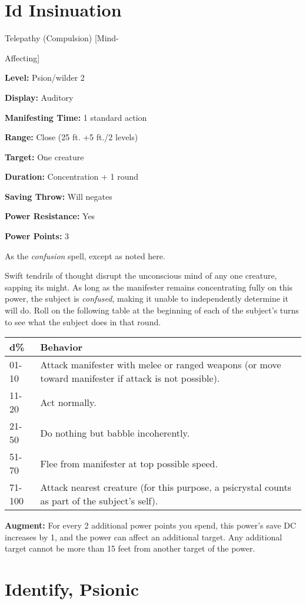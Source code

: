 \documentclass{article}
\begin{document}
\section*{Id Insinuation}

Telepathy (Compulsion) [Mind-

Affecting]

\textbf{Level:} Psion/wilder 2

\textbf{Display:} Auditory

\textbf{Manifesting Time:} 1 standard action

\textbf{Range:} Close (25 ft. +5 ft./2 levels)

\textbf{Target:} One creature

\textbf{Duration:} Concentration + 1 round

\textbf{Saving Throw:} Will negates

\textbf{Power Resistance:} Yes

\textbf{Power Points:} 3

As the \textit{confusion }spell, except as noted here.

Swift tendrils of thought disrupt the unconscious mind of any one creature, sapping 
its might. As long as the manifester remains concentrating fully on this power, 
the subject is \textit{confused}, making it unable to independently determine it 
will do. Roll on the following table at the beginning of each of the subject's 
turns to see what the subject does in that round.

\begin{tabular}{|>{\raggedright}p{28pt}|>{\raggedright}p{221pt}|}
\hline
d\textbf{\%} & B\textbf{ehavior}\tabularnewline
\hline
01-10 & Attack manifester with melee or ranged weapons (or move toward manifester 
if attack is not possible).\tabularnewline
\hline
11-20 & Act normally.\tabularnewline
\hline
21-50 & Do nothing but babble incoherently.\tabularnewline
\hline
51-70 & Flee from manifester at top possible speed.\tabularnewline
\hline
71-100 & Attack nearest creature (for this purpose, a psicrystal counts as part 
of the subject's self).\tabularnewline
\hline
\end{tabular}

\textbf{Augment:} For every 2 additional power points you spend, this power's save 
DC increases by 1, and the power can affect an additional target. Any additional 
target cannot be more than 15 feet from another target of the power.

\vspace{12pt}
\section*{Identify, Psionic}
\end{document}
